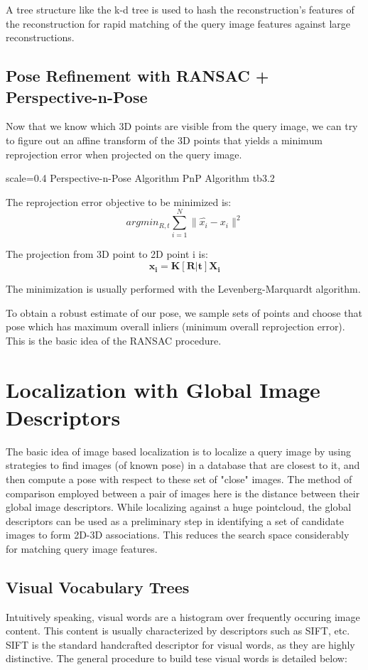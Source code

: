 A tree structure like the k-d tree is used to hash the reconstruction's features of the reconstruction for rapid matching of the query image features against large reconstructions.

\subsection{Pose Refinement with RANSAC + Perspective-n-Pose}
Now that we know which 3D points are visible from the query image, we can try to figure out an affine transform of the 3D points that yields a minimum reprojection error when projected on the query image. 

{scale=0.4}%
{Perspective-n-Pose Algorithm}%
{PnP Algorithm}%
{tb3.2} %

The reprojection error objective to be minimized is:
\[argmin_{R, t}\sum_{i=1}^{N}\|\hat{x_i} - x_i\|^2\]

The projection from 3D point to 2D point i is:
\[\mathbf{x_i} = \mathbf{K[R|t]X_i}\]

The minimization is usually performed with the Levenberg-Marquardt algorithm. 

To obtain a robust estimate of our pose, we sample sets of points and choose that pose which has maximum overall inliers (minimum overall reprojection error). This is the basic idea of the RANSAC procedure.

\section{Localization with Global Image Descriptors}
The basic idea of image based localization is to localize a query image by using strategies to find images (of known pose) in a database that are closest to it, 
and then compute a pose with respect to these set of "close" images. The method of comparison employed between a pair of images here is the distance between their global image descriptors.
While localizing against a huge pointcloud, the global descriptors can be used as a preliminary step in identifying a set of candidate images to form 2D-3D associations. 
This reduces the search space considerably for matching query image features. 


\subsection{Visual Vocabulary Trees} %
Intuitively speaking, visual words are a histogram over frequently occuring image content. This content is usually characterized by descriptors such as SIFT, etc.
SIFT is the standard handcrafted descriptor for visual words, as they are highly distinctive. The general procedure to build tese visual words is detailed below:

